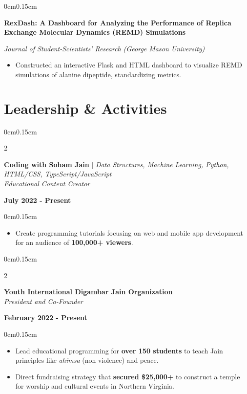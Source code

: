 \documentclass[10pt, letterpaper]{article}
\newenvironment{highlights}{
    \begin{itemize}[topsep=0pt, parsep=0pt, partopsep=0pt, itemsep=0pt, leftmargin=0.6cm]
}{
    \end{itemize}
}
\newenvironment{onecolentry}{
    \begin{adjustwidth}{0cm}{0.15cm}
}{
    \end{adjustwidth}
}
\newenvironment{twocolentry}[2][]{
    \onecolentry
    \def\secondColumn{#2}
    \setcolumnwidth{\fill, 4cm}
    \begin{paracol}{2}
}{
    \switchcolumn \raggedleft \secondColumn
    \end{paracol}
    \endonecolentry
}
\begin{document}
    \vspace{0.05cm}

    \begin{onecolentry}
        \textbf{RexDash: A Dashboard for Analyzing the Performance of Replica Exchange Molecular Dynamics (REMD) Simulations}
        
        \textit{Journal of Student-Scientists' Research (George Mason University)}
        \begin{highlights}
            \item Constructed an interactive Flask and HTML dashboard to visualize REMD simulations of alanine dipeptide, standardizing metrics.
        \end{highlights}
    \end{onecolentry}

    \vspace{0.1cm}

    \section{Leadership \& Activities}
    \vspace{0.1cm}

    \begin{twocolentry}{\textbf{July 2022 - Present}}
        \textbf{Coding with Soham Jain} | \textit{Data Structures, Machine Learning, Python, HTML/CSS, TypeScript/JavaScript} \\
        \textit{Educational Content Creator}
    \end{twocolentry}
    \vspace{-0.1cm}
    \begin{onecolentry}
        \begin{highlights}
            \item Create programming tutorials focusing on web and mobile app development for an audience of \textbf{100,000+ viewers}.
        \end{highlights}
    \end{onecolentry}

    \vspace{0.05cm}
    
    \begin{twocolentry}{\textbf{February 2022 - Present}}
        \textbf{Youth International Digambar Jain Organization} \\
        \textit{President and Co-Founder}
    \end{twocolentry}
    \vspace{-0.1cm}
    \begin{onecolentry}
        \begin{highlights}
            \item Lead educational programming for \textbf{over 150 students} to teach Jain principles like \textit{ahimsa} (non-violence) and peace.
            \item Direct fundraising strategy that \textbf{secured \$25,000+} to construct a temple for worship and cultural events in Northern Virginia.
        \end{highlights}
    \end{onecolentry}
\end{document}
